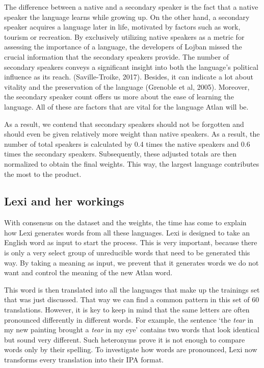 The difference between a native and a secondary speaker is the fact that a native speaker the language learns while growing up. On the other hand, a secondary speaker acquires a language later in life, motivated by factors such as work, tourism or recreation. By exclusively utilizing native speakers as a metric for assessing the importance of a language, the developers of Lojban missed the crucial information that the secondary speakers provide. The number of secondary speakers conveys a significant insight into both the language's political influence as its reach. (Saville-Troike, 2017). Besides, it can indicate a lot about vitality and the preservation of the language (Grenoble et al, 2005). Moreover, the secondary speaker count offers us more about the ease of learning the language. All of these are factors that are vital for the language Atlan will be. 

As a result, we contend that secondary speakers should not be forgotten and should even be given relatively more weight than native speakers. As a result, the number of total speakers is calculated by 0.4 times the native speakers and 0.6 times the secondary speakers. Subsequently, these adjusted totals are then normalized to obtain the final weights. This way, the largest language contributes the most to the product. 

\subsection{Lexi and her workings}

\noindent With consensus on the dataset and the weights, the time has come to explain how Lexi generates words from all these languages. Lexi is designed to take an English word as input to start the process. This is very important, because there is only a very select group of unreducible words that need to be generated this way. By taking a meaning as input, we prevent that it generates words we do not want and control the meaning of the new Atlan word. 

This word is then translated into all the languages that make up the trainings set that was just discussed. That way we can find a common pattern in this set of 60 translations. However, it is key to keep in mind that the same letters are often pronounced differently in different words. For example, the sentence ‘the \textit{tear} in my new painting brought a \textit{tear} in my eye’ contains two words that look identical but sound very different. Such heteronyms prove it is not enough to compare words only by their spelling. To investigate how words are pronounced, Lexi now transforms every translation into their IPA format. 

